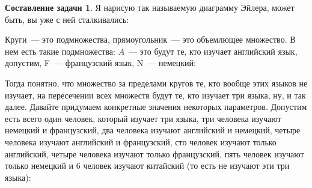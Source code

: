 \documentclass[russian]{lecture-notes}
\theoremstyle{definition}
\newtheorem*{newProblem}{Составление задачи}
\begin{document}
\begin{enumerate}
		\begin{newProblem}
			Я нарисую так называемую диаграмму Эйлера, может быть, вы уже с ней сталкивались: 
			
			\begin{figure}[H]
				\centering
			\end{figure}
			
			Круги~--- это подмножества, прямоугольник~--- это объемлющее множество. В нем есть такие подмножества: $A$~--- это будут те, кто изучает английский язык, допустим, F~--- французский язык, N~--- немецкий:
			
			\begin{figure}[H]
				\centering
			\end{figure}
			
			Тогда понятно, что множество за пределами кругов те, кто вообще этих языков не изучает, на пересечении всех множеств будут те, кто изучает три языка, ну, и так далее. Давайте придумаем конкретные значения некоторых параметров. Допустим есть всего один человек, который изучает три языка, три человека изучают немецкий и французский, два человека изучают английский и немецкий, четыре человека изучают английский и французский, сто человек изучают только английский, четыре человека изучают только французский, пять человек изучают только немецкий и 6 человек изучают китайский (то есть не изучают эти три языка):
			
			\begin{figure}[H]
				\centering
\end{figure}
\end{newProblem}
\end{enumerate}
\end{document}
